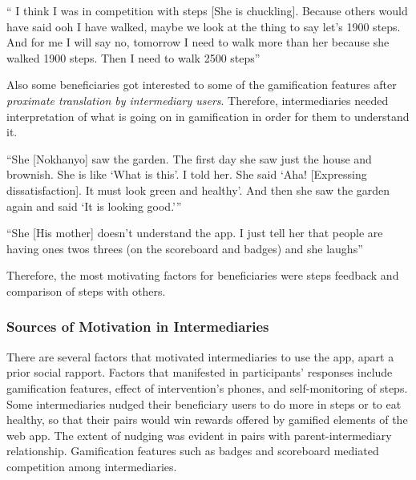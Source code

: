 {`` I think I was in competition with steps [She is chuckling]. Because others would have said ooh I have walked, maybe we look at the thing to say let’s 1900 steps. And for me I will say no, tomorrow I need to walk more than her because she walked 1900 steps. Then I need to walk 2500 steps''} 

Also some beneficiaries got interested to some of the gamification features after \emph{proximate translation by intermediary users}. Therefore, intermediaries needed interpretation of what is going on in gamification in order for them to understand it.

 {``She [Nokhanyo] saw the garden. The first day she saw just the house and brownish. She is like `What is this'. I told her. She said `Aha! [Expressing
dissatisfaction]. It must look green and healthy'. And then
she saw the garden again and said `It is looking good.'''}  

 {``She [His mother] doesn't understand the app. I just tell her that people are having ones twos threes (on the scoreboard and badges) and she laughs''} 

Therefore, the most motivating factors for beneficiaries were steps feedback and comparison of steps with others. 
\subsubsection{Sources of Motivation in Intermediaries}
There are several factors that motivated intermediaries to use the app, apart a prior social rapport. Factors that manifested in participants' responses include gamification features, effect of intervention's phones, and self-monitoring of steps. Some intermediaries nudged their beneficiary
users to do more in steps or to eat healthy, so that their pairs would win rewards offered by gamified elements of the web app. The extent of nudging was evident in pairs with parent-intermediary relationship. Gamification features such as badges and scoreboard mediated competition among intermediaries.


